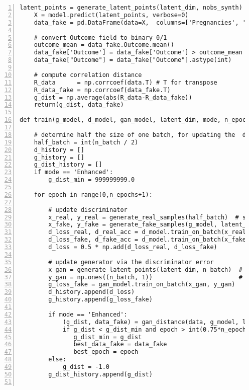 \documentclass[oneside,10pt]{book}
\begin{document}
\begin{lstlisting}[numbers=left]
    latent_points = generate_latent_points(latent_dim, nobs_synth)  
    X = model.predict(latent_points, verbose=0)  
    data_fake = pd.DataFrame(data=X,  columns=['Pregnancies', 'Glucose', 'BloodPressure', 'SkinThickness', 'Insulin', 'BMI', 'DiabetesPedigreeFunction', 'Age', 'Outcome'])
 
    # convert Outcome field to binary 0/1
    outcome_mean = data_fake.Outcome.mean()
    data_fake['Outcome'] = data_fake['Outcome'] > outcome_mean
    data_fake["Outcome"] = data_fake["Outcome"].astype(int)

    # compute correlation distance
    R_data      = np.corrcoef(data.T) # T for transpose
    R_data_fake = np.corrcoef(data_fake.T)
    g_dist = np.average(abs(R_data-R_data_fake))
    return(g_dist, data_fake) 

def train(g_model, d_model, gan_model, latent_dim, mode, n_epochs=10000, n_batch=128, n_eval=50):   
    
    # determine half the size of one batch, for updating the  discriminator
    half_batch = int(n_batch / 2)
    d_history = [] 
    g_history = [] 
    g_dist_history = []
    if mode == 'Enhanced':
        g_dist_min = 999999999.0  

    for epoch in range(0,n_epochs+1): 
                 
        # update discriminator
        x_real, y_real = generate_real_samples(half_batch)  # sample from real data
        x_fake, y_fake = generate_fake_samples(g_model, latent_dim, half_batch)
        d_loss_real, d_real_acc = d_model.train_on_batch(x_real, y_real) 
        d_loss_fake, d_fake_acc = d_model.train_on_batch(x_fake, y_fake)
        d_loss = 0.5 * np.add(d_loss_real, d_loss_fake)

        # update generator via the discriminator error
        x_gan = generate_latent_points(latent_dim, n_batch)  # random input for generator
        y_gan = np.ones((n_batch, 1))                        # label = 1 for fake samples
        g_loss_fake = gan_model.train_on_batch(x_gan, y_gan) 
        d_history.append(d_loss)
        g_history.append(g_loss_fake)

        if mode == 'Enhanced': 
            (g_dist, data_fake) = gan_distance(data, g_model, latent_dim, nobs_synth=400)
            if g_dist < g_dist_min and epoch > int(0.75*n_epochs): 
               g_dist_min = g_dist
               best_data_fake = data_fake
               best_epoch = epoch
        else: 
            g_dist = -1.0
        g_dist_history.append(g_dist)
                

\end{lstlisting}
\end{document}
